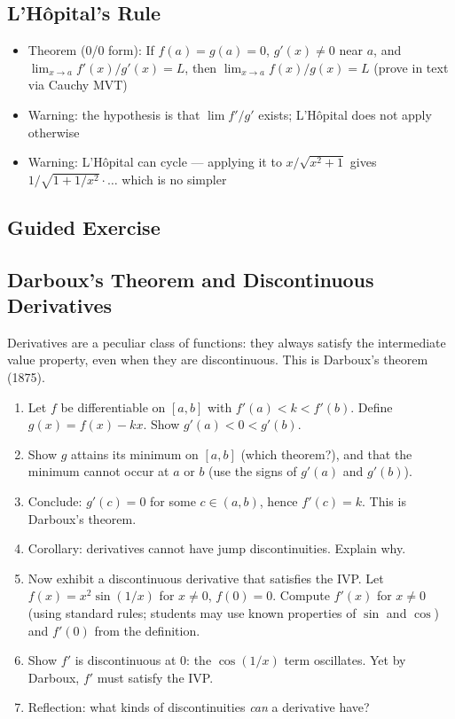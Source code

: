 \documentclass[
  10pt,
  letterpaper,
]{scrbook}
\providecommand{\tightlist}{%
  \setlength{\itemsep}{0pt}\setlength{\parskip}{0pt}}
\begin{document}
\subsection{L'Hôpital's Rule}\label{lhuxf4pitals-rule}

\begin{itemize}
\tightlist
\item
  Theorem (0/0 form): If \(f(a) = g(a) = 0\), \(g'(x) \neq 0\) near
  \(a\), and \(\lim_{x \to a} f'(x)/g'(x) = L\), then
  \(\lim_{x \to a} f(x)/g(x) = L\) (prove in text via Cauchy MVT)
\item
  Warning: the hypothesis is that \(\lim f'/g'\) exists; L'Hôpital does
  not apply otherwise
\item
  Warning: L'Hôpital can cycle --- applying it to \(x/\sqrt{x^2+1}\)
  gives \(1/\sqrt{1 + 1/x^2} \cdot \ldots\) which is no simpler
\end{itemize}

\subsection{Guided Exercise}\label{guided-exercise-16}

\subsection{Darboux's Theorem and Discontinuous
Derivatives}\label{darbouxs-theorem-and-discontinuous-derivatives}

Derivatives are a peculiar class of functions: they always satisfy the
intermediate value property, even when they are discontinuous. This is
Darboux's theorem (1875).

\begin{enumerate}
\def\labelenumi{(\alph{enumi})}
\item
  Let \(f\) be differentiable on \([a,b]\) with \(f'(a) < k < f'(b)\).
  Define \(g(x) = f(x) - kx\). Show \(g'(a) < 0 < g'(b)\).
\item
  Show \(g\) attains its minimum on \([a,b]\) (which theorem?), and that
  the minimum cannot occur at \(a\) or \(b\) (use the signs of \(g'(a)\)
  and \(g'(b)\)).
\item
  Conclude: \(g'(c) = 0\) for some \(c \in (a,b)\), hence \(f'(c) = k\).
  This is Darboux's theorem.
\item
  Corollary: derivatives cannot have jump discontinuities. Explain why.
\item
  Now exhibit a discontinuous derivative that satisfies the IVP. Let
  \(f(x) = x^2 \sin(1/x)\) for \(x \neq 0\), \(f(0) = 0\). Compute
  \(f'(x)\) for \(x \neq 0\) (using standard rules; students may use
  known properties of \(\sin\) and \(\cos\)) and \(f'(0)\) from the
  definition.
\item
  Show \(f'\) is discontinuous at \(0\): the \(\cos(1/x)\) term
  oscillates. Yet by Darboux, \(f'\) must satisfy the IVP.
\item
  Reflection: what kinds of discontinuities \emph{can} a derivative
  have?
\end{enumerate}
\end{document}
